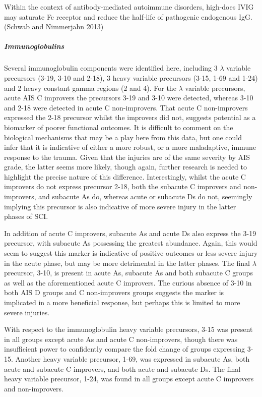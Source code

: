 \documentclass[9pt,lineno]{elife}
\begin{document}
Within the context of antibody-mediated autoimmune disorders, high-does IVIG may saturate Fc receptor and reduce the half-life of pathogenic endogenous IgG.(Schwab and Nimmerjahn 2013)

\hypertarget{immunoglobulins}{%
\subparagraph{Immunoglobulins}\label{immunoglobulins}}

Several immunoglobulin components were identified here, including 3 \(\lambda\) variable precursors (3-19, 3-10 and 2-18), 3 heavy variable precursors (3-15, 1-69 and 1-24) and 2 heavy constant gamma regions (2 and 4).
For the \(\lambda\) variable precursors, acute AIS C improvers the precursors 3-19 and 3-10 were detected, whereas 3-10 and 2-18 were detected in acute C non-improvers.
That acute C non-improvers expressed the 2-18 precursor whilst the improvers did not, suggests potential as a biomarker of poorer functional outcomes.
It is difficult to comment on the biological mechanisms that may be a play here from this data, but one could infer that it is indicative of either a more robust, or a more maladaptive, immune response to the trauma.
Given that the injuries are of the same severity by AIS grade, the latter seems more likely, though again, further research is needed to highlight the precise nature of this difference.
Interestingly, whilst the acute C improvers do not express precursor 2-18, both the subacute C improvers and non-improvers, and subacute As do, whereas acute or subacute Ds do not, seemingly implying this precursor is also indicative of more severe injury in the latter phases of SCI.

In addition of acute C improvers, subacute As and acute Ds also express the 3-19 precursor, with subacute As possessing the greatest abundance.
Again, this would seem to suggest this marker is indicative of positive outcomes or less severe injury in the acute phase, but may be more detrimental in the latter phases.
The final \(\lambda\) precursor, 3-10, is present in acute As, subacute As and both subacute C groups as well as the aforementioned acute C improvers.
The curious absence of 3-10 in both AIS D groups and C non-improvers groups suggests the marker is implicated in a more beneficial response, but perhaps this is limited to more severe injuries.

With respect to the immunoglobulin heavy variable precursors, 3-15 was present in all groups except acute As and acute C non-improvers, though there was insufficient power to confidently compare the fold change of groups expressing 3-15.
Another heavy variable precursor, 1-69, was expressed in subacute As, both acute and subacute C improvers, and both acute and subacute Ds.
The final heavy variable precursor, 1-24, was found in all groups except acute C improvers and non-improvers.
\end{document}

